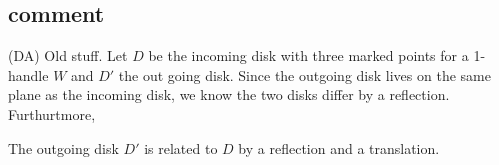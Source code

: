 \documentclass[12pt,a4paper]{article}
\newcommand{\dave}[1]{{\color{ao(english)}\footnotesize{(DA) #1}}}
\begin{document}



 
\subsection{comment}
\dave{Old stuff.}
Let $D$ be the incoming disk with three marked points for a 1-handle $W$ and $D'$ the out going disk.
Since the outgoing disk lives on the same plane as the incoming disk, we know the two disks differ by a reflection. 
Furthurtmore, 



The outgoing disk $D'$ is related to $D$ by a reflection and a translation. 
\end{document}
